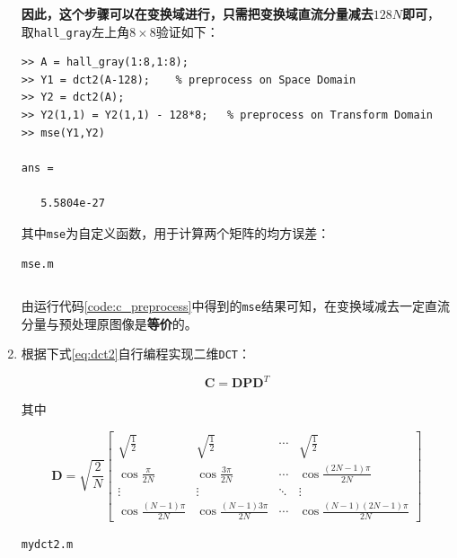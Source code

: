 \documentclass{article}
\numberwithin{figure}{section}
\numberwithin{table}{section}
\numberwithin{listing}{section}
\numberwithin{equation}{section}
\begin{document}
\begin{enumerate}
                \textbf{因此，这个步骤可以在变换域进行，只需把变换域直流分量减去$128N$即可}，取\texttt{hall\_gray}左上角$8\times 8$验证如下：

                \begin{verbatim}
>> A = hall_gray(1:8,1:8);
>> Y1 = dct2(A-128);    % preprocess on Space Domain
>> Y2 = dct2(A);
>> Y2(1,1) = Y2(1,1) - 128*8;   % preprocess on Transform Domain
>> mse(Y1,Y2)

ans =

   5.5804e-27
                \end{verbatim}

                其中\texttt{mse}为自定义函数，用于计算两个矩阵的均方误差：

                \begin{listing}[H]
                    \caption{\texttt{mse.m}}
                    \label{code:mse}
                    \inputminted{matlab}{../mse.m}
                \end{listing}

                由运行代码\ref{code:c_preprocess}中得到的\texttt{mse}结果可知，在变换域减去一定直流分量与预处理原图像是\textbf{等价}的。

            \item 根据下式\ref{eq:dct2}自行编程实现二维\texttt{DCT}：

                \begin{equation}
                    \label{eq:dct2}
                    \mathbf{C} = \mathbf{DPD}^T
                \end{equation}

                其中

                \[
                    \mathbf{D} = \sqrt{\frac{2}{N}} \begin{bmatrix}
                        \sqrt{\frac{1}{2}} & \sqrt{\frac{1}{2}} & \cdots & \sqrt{\frac{1}{2}} \\
                        \cos{\frac{\pi}{2N}} & \cos{\frac{3\pi}{2N}} & \cdots & \cos{\frac{(2N-1)\pi}{2N}} \\
                        \vdots & \vdots & \ddots & \vdots \\
                        \cos{\frac{(N-1)\pi}{2N}} & \cos{\frac{(N-1)3\pi}{2N}} & \cdots & \cos{\frac{(N-1)(2N-1)\pi}{2N}}
                    \end{bmatrix}
                \]

                \begin{listing}[H]
                    \caption{\texttt{mydct2.m}}
                    \label{code:mydct2}
                    \inputminted{matlab}{../mydct2.m}
                \end{listing}


\end{enumerate}
\end{document}
